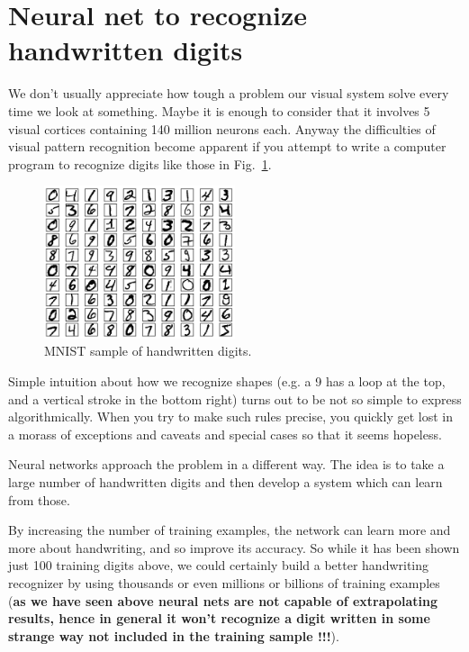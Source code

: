 \section{Neural net to recognize handwritten digits}
\label{neural-net-to-recognize-handwritten-digits}

We don't usually appreciate how tough a problem our visual system solve every time we look at something.
Maybe it is enough to consider that it involves 5 visual cortices containing 140 million neurons each. Anyway the difficulties of visual pattern recognition become apparent if you attempt to write a computer program to recognize digits like those in Fig.~\ref{fig:mnist}.

\begin{figure}[htb]
\centering
\includegraphics[width=0.5\textwidth]{figures/mnist_100_digits}
\caption{MNIST sample of handwritten digits.}
\label{fig:mnist}
\end{figure}

Simple intuition about how we recognize shapes (e.g. a 9 has a loop at the top, and a vertical stroke in the bottom right) turns out to be not so simple to express algorithmically. When you try to make such rules precise, you quickly get lost in a morass of exceptions and caveats and special cases so that it seems hopeless.

Neural networks approach the problem in a different way. The idea is to take a large number of handwritten digits and then develop a system which can learn from those.

By increasing the number of training examples, the network can learn more and more about handwriting, and so improve its accuracy. So while it has been shown just 100 training digits above, we could certainly build a better handwriting recognizer by using thousands or even millions or billions of training examples (\textbf{as we have seen above neural nets are not capable of extrapolating results, hence in general it won't recognize a digit written in some strange way not included in the training sample !!!}).

